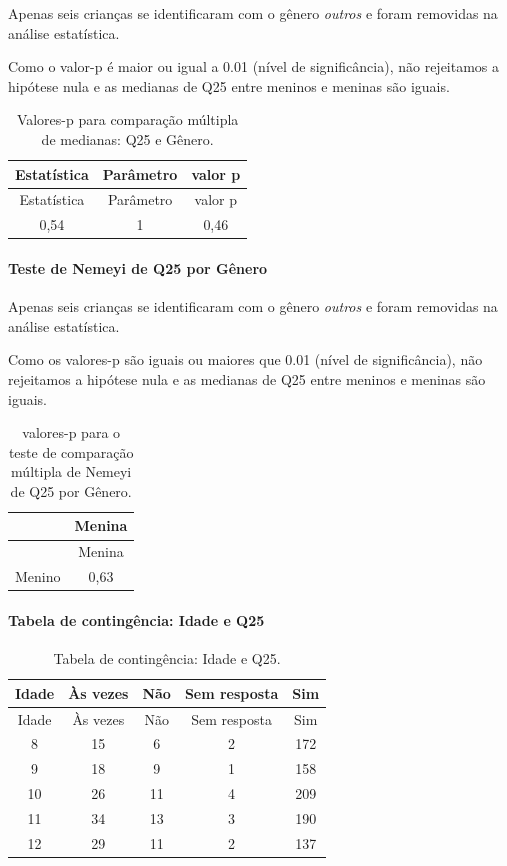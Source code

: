 \documentclass[]{article}
\let\oldparagraph\paragraph
\renewcommand{\paragraph}[1]{\oldparagraph{#1}\mbox{}}
\begin{document}
Apenas seis crianças se identificaram com o gênero \emph{outros} e foram removidas na análise estatística.

Como o valor-p é maior ou igual a 0.01 (nível de significância), não rejeitamos a hipótese nula e as medianas de Q25 entre meninos e meninas são iguais.

\begin{longtable}[]{@{}ccc@{}}
\caption{\label{tab:unnamed-chunk-679}Valores-p para comparação múltipla de medianas: Q25 e Gênero.}\tabularnewline
\toprule
Estatística & Parâmetro & valor p\tabularnewline
\midrule
\endfirsthead
\toprule
Estatística & Parâmetro & valor p\tabularnewline
\midrule
\endhead
0,54 & 1 & 0,46\tabularnewline
\bottomrule
\end{longtable}

\hypertarget{teste-de-nemeyi-de-q25-por-guxeanero}{%
\paragraph{Teste de Nemeyi de Q25 por Gênero}\label{teste-de-nemeyi-de-q25-por-guxeanero}}

Apenas seis crianças se identificaram com o gênero \emph{outros} e foram removidas na análise estatística.

Como os valores-p são iguais ou maiores que 0.01 (nível de significância), não rejeitamos a hipótese nula e as medianas de Q25 entre meninos e meninas são iguais.

\begin{longtable}[]{@{}lc@{}}
\caption{\label{tab:unnamed-chunk-681}valores-p para o teste de comparação múltipla de Nemeyi de Q25 por Gênero.}\tabularnewline
\toprule
& Menina\tabularnewline
\midrule
\endfirsthead
\toprule
& Menina\tabularnewline
\midrule
\endhead
Menino & 0,63\tabularnewline
\bottomrule
\end{longtable}

\cleardoublepage

\hypertarget{tabela-de-continguxeancia-idade-e-q25}{%
\paragraph{Tabela de contingência: Idade e Q25}\label{tabela-de-continguxeancia-idade-e-q25}}

\begin{longtable}[]{@{}ccccc@{}}
\caption{\label{tab:unnamed-chunk-682}Tabela de contingência: Idade e Q25.}\tabularnewline
\toprule
Idade & Às vezes & Não & Sem resposta & Sim\tabularnewline
\midrule
\endfirsthead
\toprule
Idade & Às vezes & Não & Sem resposta & Sim\tabularnewline
\midrule
\endhead
8 & 15 & 6 & 2 & 172\tabularnewline
9 & 18 & 9 & 1 & 158\tabularnewline
10 & 26 & 11 & 4 & 209\tabularnewline
11 & 34 & 13 & 3 & 190\tabularnewline
12 & 29 & 11 & 2 & 137\tabularnewline
\bottomrule
\end{longtable}
\end{document}
